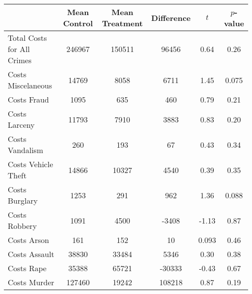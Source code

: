 {
\def\sym#1{\ifmmode^{#1}\else\(^{#1}\)\fi}
\begin{tabular}{l*{1}{ccccc}}
\hline\hline
                    &Mean Control&Mean Treatment&  Difference&           $t$& $p$-value\\
\hline
Total Costs for All Crimes&      246967&      150511&       96456&        0.64&        0.26\\
Costs Miscelaneous  &       14769&        8058&        6711&        1.45&       0.075\\
Costs Fraud         &        1095&         635&         460&        0.79&        0.21\\
Costs Larceny       &       11793&        7910&        3883&        0.83&        0.20\\
Costs Vandalism     &         260&         193&          67&        0.43&        0.34\\
Costs Vehicle Theft &       14866&       10327&        4540&        0.39&        0.35\\
Costs Burglary      &        1253&         291&         962&        1.36&       0.088\\
Costs Robbery       &        1091&        4500&       -3408&       -1.13&        0.87\\
Costs Arson         &         161&         152&          10&       0.093&        0.46\\
Costs Assault       &       38830&       33484&        5346&        0.30&        0.38\\
Costs Rape          &       35388&       65721&      -30333&       -0.43&        0.67\\
Costs Murder        &      127460&       19242&      108218&        0.87&        0.19\\
\hline\hline
\end{tabular}
}
